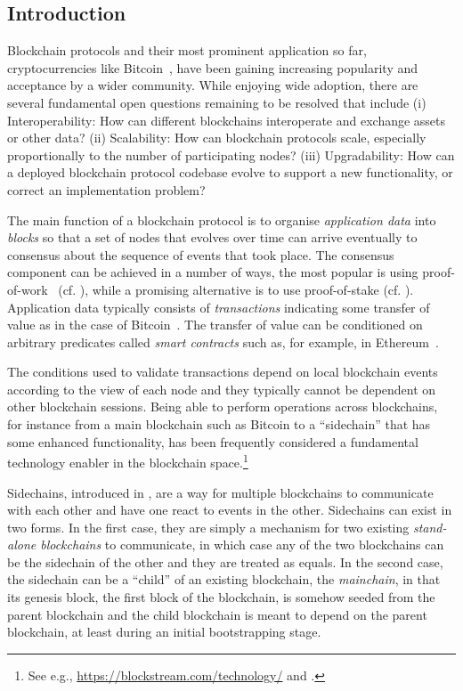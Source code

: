 \subsection{Introduction}


Blockchain protocols and their most
prominent application so far,  cryptocurrencies like Bitcoin~\cite{bitcoin},
have been gaining increasing popularity and acceptance by
a wider community.   While enjoying wide adoption,
there  are several fundamental open questions remaining to be resolved
that include (i)
         Interoperability:
           How can different blockchains interoperate and exchange
           assets or other data?
(ii)  Scalability:
           How can blockchain protocols scale, especially proportionally to the number of           participating nodes?
(iii)
         Upgradability:
           How can a deployed blockchain protocol codebase evolve to support a new
           functionality, or correct an implementation problem?

The main function of a blockchain protocol  is to organise \textit{application
data} into \textit{blocks} so that a set of nodes that evolves over time can
arrive eventually to consensus about the sequence of events that took place.
The consensus component can be achieved in a number of ways, the most popular
is using proof-of-work~\cite{pow} (cf. \cite{bitcoin,backbone}),
while a promising alternative is to use proof-of-stake
(cf. \cite{algorand,ouroboros,snowwhite,praos}).
Application data typically
consists of \textit{transactions} indicating some transfer of value as in the
case of Bitcoin~\cite{bitcoin}.  The transfer of value can be conditioned on
arbitrary predicates called \textit{smart contracts} such as, for example, in
Ethereum~\cite{buterin,wood}.

The conditions used to validate transactions %
depend on local blockchain events according to the view of each node and they
typically cannot be dependent on other blockchain sessions. Being
able to perform operations across blockchains, for instance from a main blockchain
such as Bitcoin to a ``sidechain'' that has some enhanced functionality, has been
frequently considered  a fundamental technology enabler in the blockchain space.\footnote{See
e.g., \url{https://blockstream.com/technology/} and \cite{sidechains}.  }


Sidechains, introduced in \cite{sidechains},  are a
way for multiple blockchains to communicate with each other and have one react
to events in the other. Sidechains can exist in two forms. In the first case, they are simply a mechanism for two
existing \textit{stand-alone blockchains} to communicate, in which case any of
the two blockchains can be the sidechain of the other and they are treated as
equals. In the second case, the
sidechain can be a ``child'' of an existing blockchain, the \textit{mainchain},
in that its genesis block, the first block of the blockchain, is somehow seeded
from the parent blockchain and the child blockchain is meant to depend on the
parent blockchain, at least during an initial bootstrapping stage.

